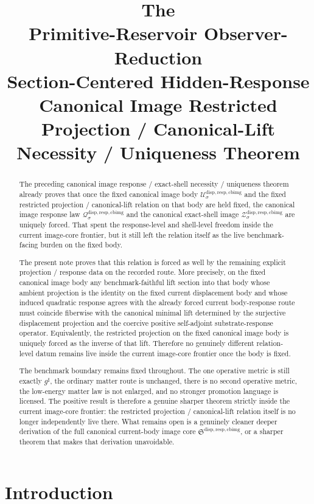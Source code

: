 \documentclass[11pt]{article}
\title{\textbf{The \TheoryName{}}\\[0.4em]
\large Primitive-Reservoir Observer-Reduction\\
\large Section-Centered Hidden-Response\\
\large Canonical Image Restricted Projection / Canonical-Lift\\
\large Necessity / Uniqueness Theorem}
\author{}
\date{}
\newcommand{\CompletedMetric}{g^{\sharp}}
\newcommand{\CurrentBodyImageCore}{\mathfrak S^{\mathrm{disp,resp,cbimg}}}
\newcommand{\CanonicalImageBody}[1]{\mathcal U_{#1}^{\mathrm{disp,resp,cbimg}}}
\newcommand{\CanonicalImageShell}[1]{\mathcal Z_{#1}^{\mathrm{disp,resp,cbimg}}}
\newcommand{\CanonicalImageResponseLaw}[1]{\mathscr Q_{#1}^{\mathrm{disp,resp,cbimg}}}
\begin{document}
\maketitle

\begin{abstract}
The preceding canonical image response / exact-shell necessity / uniqueness theorem already proves that once the fixed canonical image body \(\CanonicalImageBody{\sigma}\) and the fixed restricted projection / canonical-lift relation on that body are held fixed, the canonical image response law \(\CanonicalImageResponseLaw{\sigma}\) and the canonical exact-shell image \(\CanonicalImageShell{\sigma}\) are uniquely forced. That spent the response-level and shell-level freedom inside the current image-core frontier, but it still left the relation itself as the live benchmark-facing burden on the fixed body.

The present note proves that this relation is forced as well by the remaining explicit projection / response data on the recorded route. More precisely, on the fixed canonical image body any benchmark-faithful lift section into that body whose ambient projection is the identity on the fixed current displacement body and whose induced quadratic response agrees with the already forced current body-response route must coincide fiberwise with the canonical minimal lift determined by the surjective displacement projection and the coercive positive self-adjoint substrate-response operator. Equivalently, the restricted projection on the fixed canonical image body is uniquely forced as the inverse of that lift. Therefore no genuinely different relation-level datum remains live inside the current image-core frontier once the body is fixed.

The benchmark boundary remains fixed throughout. The one operative metric is still exactly \(\CompletedMetric\), the ordinary matter route is unchanged, there is no second operative metric, the low-energy matter law is not enlarged, and no stronger promotion language is licensed. The positive result is therefore a genuine sharper theorem strictly inside the current image-core frontier: the restricted projection / canonical-lift relation itself is no longer independently live there. What remains open is a genuinely cleaner deeper derivation of the full canonical current-body image core \(\CurrentBodyImageCore\), or a sharper theorem that makes that derivation unavoidable.
\end{abstract}

\section{Introduction}
\end{document}
